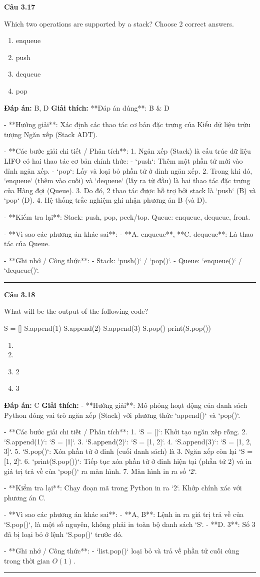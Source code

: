 \documentclass[11pt,a4paper]{article}
\newenvironment{question}[1]{%
  \par\vspace{1em}\noindent\textbf{\large Câu #1}\par\vspace{0.4em}
}{%
  \par\vspace{1em}\hrule\vspace{0.6em}
}
\newenvironment{choices}{%
  \begin{enumerate}[label=\textbf{\Alph*.},leftmargin=2.2em,itemsep=2pt,topsep=3pt]
}{%
  \end{enumerate}
}
\newcommand{\choice}{\item}
\newenvironment{codebox}{%
  \begin{tcolorbox}[colback=gray!8!white,colframe=gray!50!black,arc=1.5mm,boxrule=0.6pt,left=3mm,right=3mm,top=2.5mm,bottom=2.5mm]
  \ttfamily\small
}{%
  \end{tcolorbox}
}
\begin{document}
\begin{question}{3.17}
Which two operations are supported by a stack? Choose 2 correct answers.
\begin{choices}
\choice enqueue
\choice push
\choice dequeue
\choice pop
\end{choices}
\textbf{Đáp án:} B, D
\textbf{Giải thích:} **Đáp án đúng**: B & D

- **Hướng giải**:
  Xác định các thao tác cơ bản đặc trưng của Kiểu dữ liệu trừu tượng Ngăn xếp (Stack ADT).

- **Các bước giải chi tiết / Phân tích**:
  1. Ngăn xếp (Stack) là cấu trúc dữ liệu LIFO có hai thao tác cơ bản chính thức:
     - `push`: Thêm một phần tử mới vào đỉnh ngăn xếp.
     - `pop`: Lấy và loại bỏ phần tử ở đỉnh ngăn xếp.
  2. Trong khi đó, `enqueue` (thêm vào cuối) và `dequeue` (lấy ra từ đầu) là hai thao tác đặc trưng của Hàng đợi (Queue).
  3. Do đó, 2 thao tác được hỗ trợ bởi stack là `push` (B) và `pop` (D).
  4. Hệ thống trắc nghiệm ghi nhận phương án B (và D).

- **Kiểm tra lại**:
  Stack: push, pop, peek/top.
  Queue: enqueue, dequeue, front.

- **Vì sao các phương án khác sai**:
  - **A. enqueue**, **C. dequeue**: Là thao tác của Queue.

- **Ghi nhớ / Công thức**:
  - Stack: `push()` / `pop()`.
  - Queue: `enqueue()` / `dequeue()`.
\end{question}

\begin{question}{3.18}
What will be the output of the following code?
\begin{codebox}
S = []
S.append(1)
S.append(2)
S.append(3)
S.pop()
print(S.pop())
\end{codebox}
\begin{choices}
\choice [1, 2, 3]
\choice [1, 2]
\choice 2
\choice 3
\end{choices}
\textbf{Đáp án:} C
\textbf{Giải thích:} - **Hướng giải**:
  Mô phỏng hoạt động của danh sách Python đóng vai trò ngăn xếp (Stack) với phương thức `append()` và `pop()`.

- **Các bước giải chi tiết / Phân tích**:
  1. `S = []`: Khởi tạo ngăn xếp rỗng.
  2. `S.append(1)`: `S = [1]`.
  3. `S.append(2)`: `S = [1, 2]`.
  4. `S.append(3)`: `S = [1, 2, 3]`.
  5. `S.pop()`: Xóa phần tử ở đỉnh (cuối danh sách) là 3. Ngăn xếp còn lại `S = [1, 2]`.
  6. `print(S.pop())`: Tiếp tục xóa phần tử ở đỉnh hiện tại (phần tử 2) và in giá trị trả về của `pop()` ra màn hình.
  7. Màn hình in ra số `2`.

- **Kiểm tra lại**:
  Chạy đoạn mã trong Python in ra `2`.
  Khớp chính xác với phương án C.

- **Vì sao các phương án khác sai**:
  - **A, B**: Lệnh in ra giá trị trả về của `S.pop()`, là một số nguyên, không phải in toàn bộ danh sách `S`.
  - **D. 3**: Số 3 đã bị loại bỏ ở lệnh `S.pop()` trước đó.

- **Ghi nhớ / Công thức**:
  - `list.pop()` loại bỏ và trả về phần tử cuối cùng trong thời gian \(O(1)\).
\end{question}
\end{document}
